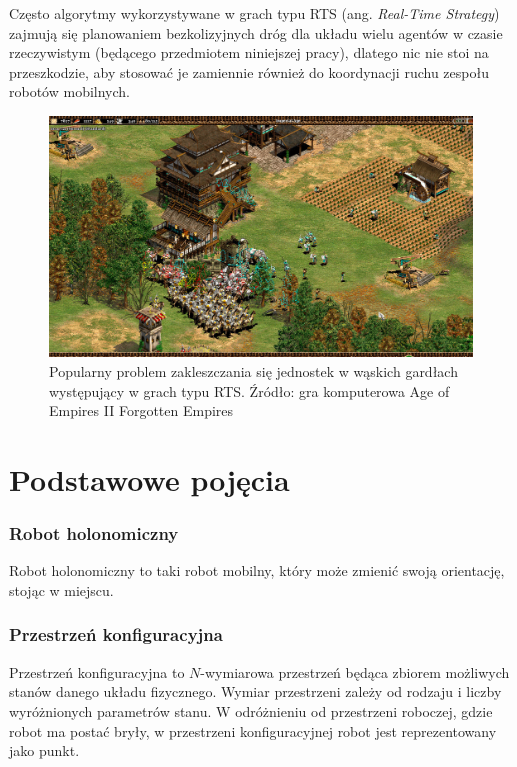 Często algorytmy wykorzystywane w grach typu RTS (ang. {\it Real-Time Strategy}) zajmują się planowaniem bezkolizyjnych dróg dla układu wielu agentów w czasie rzeczywistym (będącego przedmiotem niniejszej pracy), dlatego nic nie stoi na przeszkodzie, aby stosować je zamiennie również do koordynacji ruchu zespołu robotów mobilnych.

\begin{figure}[H]
	\centering
	\includegraphics[width=15cm]{img/games/age-deadlock2}
	\caption{Popularny problem zakleszczania się jednostek w wąskich gardłach występujący w grach typu RTS. Źródło: gra komputerowa Age of Empires II Forgotten Empires}
	\label{fig:img_games_age-deadlock}
\end{figure}

\section{Podstawowe pojęcia}
\subsubsection{Robot holonomiczny}
Robot holonomiczny to taki robot mobilny, który może zmienić swoją orientację, stojąc w miejscu.

\subsubsection{Przestrzeń konfiguracyjna}
Przestrzeń konfiguracyjna to $N$-wymiarowa przestrzeń będąca zbiorem możliwych stanów danego układu fizycznego.
Wymiar przestrzeni zależy od rodzaju i liczby wyróżnionych parametrów stanu.
W odróżnieniu od przestrzeni roboczej, gdzie robot ma postać bryły, w przestrzeni konfiguracyjnej robot jest reprezentowany jako punkt.

